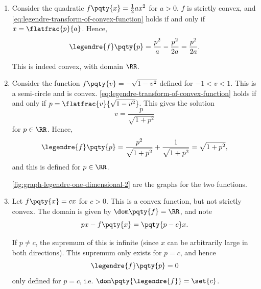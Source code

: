 \begin{examples}[Legendre Transforms for \(n = 1\)]
    \label{ex:legendre-one-dimensional}%
    \begin{enumerate}
        \item Consider the quadratic \(f\pqty{x} = \frac{1}{2} a x^2\) for \(a > 0\). \(f\) is strictly convex, and \eqref{eq:legendre-transform-of-convex-function} holds if and only if \(x = \flatfrac{p}{a}\). Hence,
        \[
            \legendre{f} \pqty{p} = \frac{p^2}{a} - \frac{p^2}{2a} = \frac{p^2}{2a}.
        \]
        
        This is indeed convex, with domain \(\RR\).

        \item Consider the function \(f\pqty{v} = - \sqrt{1 - v^2}\) defined for \(-1 < v < 1\). This is a semi-circle and is convex. \eqref{eq:legendre-transform-of-convex-function} holds if and only if \(p = \flatfrac{v}{\sqrt{1 - v^2}}\). This gives the solution
        \[
            v = \frac{p}{\sqrt{1 + p^2}}
        \]
        for \(p \in \RR\). Hence,
        \[
            \legendre{f} \pqty{p} = \frac{p^2}{\sqrt{1 + p^2}} + \frac{1}{\sqrt{1 + p^2}} = \sqrt{1 + p^2},
        \]
        and this is defined for \(p \in \RR\).

        \autoref{fig:graph-legendre-one-dimensional-2} are the graphs for the two functions.

        \item Let \(f\pqty{x} = cx\) for \(c > 0\). This is a convex function, but not strictly convex. The domain is given by \(\dom\pqty{f} = \RR\), and note
        \[
            px - f\pqty{x} = \pqty{p - c} x.
        \]

        If \(p \neq c\), the supremum of this is infinite (since \(x\) can be arbitrarily large in both directions). This supremum only exists for \(p = c\), and hence
        \[
            \legendre{f}\pqty{p} = 0
        \]
        only defined for \(p = c\), i.e. \(\dom \pqty{\legendre{f}} = \set{c}\).
    \end{enumerate}
\end{examples}

